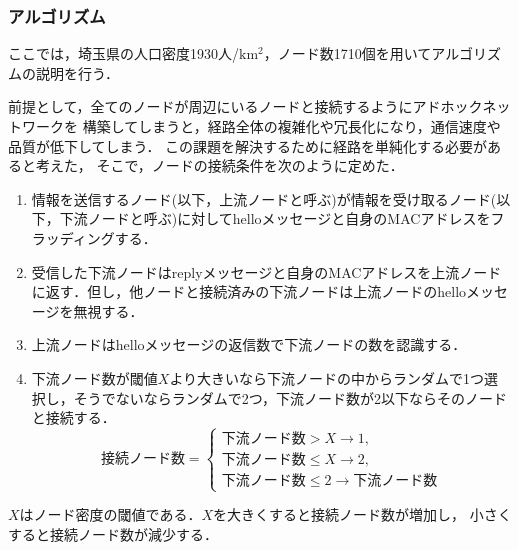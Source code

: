 \documentclass[a4paper, 11pt]{ltjsarticle}
\begin{document}


\clearpage
\subsubsection{アルゴリズム} \label{algorithm}
ここでは，埼玉県の人口密度1930人/$\mathrm{km^2}$，ノード数1710個を用いてアルゴリズムの説明を行う．

前提として，全てのノードが周辺にいるノードと接続するようにアドホックネットワークを
構築してしまうと，経路全体の複雑化や冗長化になり，通信速度や品質が低下してしまう．
この課題を解決するために経路を単純化する必要があると考えた，
そこで，ノードの接続条件を次のように定めた．


\begin{enumerate}[label=\ding{\numexpr171+\arabic*}]
  \item \label{2-1} 情報を送信するノード(以下，上流ノードと呼ぶ)が情報を受け取るノード(以下，下流ノードと呼ぶ)に対してhelloメッセージと自身のMACアドレスをフラッディングする．
  \item \label{2-2} 受信した下流ノードはreplyメッセージと自身のMACアドレスを上流ノードに返す．但し，他ノードと接続済みの下流ノードは上流ノードのhelloメッセージを無視する．
  \item \label{2-3} 上流ノードはhelloメッセージの返信数で下流ノードの数を認識する．
  \item \label{2-4} 下流ノード数が閾値$X$より大きいなら下流ノードの中からランダムで1つ選択し，そうでないならランダムで2つ，下流ノード数が2以下ならそのノードと接続する．
  \[
    \text{接続ノード数} = 
    \begin{cases} 
    \text{下流ノード数} > X \rightarrow 1, \\
    \text{下流ノード数} \leq X \rightarrow 2, \\
    \text{下流ノード数}  \leq 2 \rightarrow \text{下流ノード数}
    \end{cases}
  \]
\end{enumerate}
$X$はノード密度の閾値である．$X$を大きくすると接続ノード数が増加し，
小さくすると接続ノード数が減少する．
\end{document}
